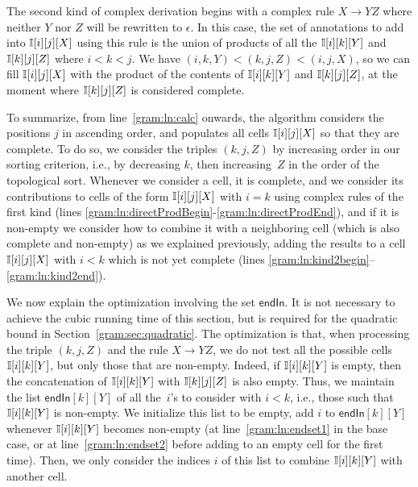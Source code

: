 The second kind of complex derivation begins with a complex rule $X
\rightarrow YZ$ where neither $Y$ nor $Z$ will be rewritten to $\epsilon$. In this case, the set of
annotations to add into $\mathbb{I}[i][j][X]$ using this rule is the union of
products of all the $\mathbb{I}[i][k][Y]$ and $\mathbb{I}[k][j][Z]$ where $i < k <
j$. We have $(i,k,Y)<(k,j,Z)<(i,j,X)$, so we can fill $\mathbb{I}[i][j][X]$ with the product of the contents of $\mathbb{I}[i][k][Y]$ and $\mathbb{I}[k][j][Z]$,
at the moment where $\mathbb{I}[k][j][Z]$ is considered complete.
%
%
%
%

To summarize, from line~\ref{gram:ln:calc} onwards, the algorithm
considers the positions $j$ in ascending order, and 
populates all cells $\mathbb{I}[i][j][X]$ so that they are complete. To do
so, we consider the triples $(k,j,Z)$ by increasing order in our
sorting criterion, i.e., by decreasing $k$, then increasing~$Z$ in the
order of the topological sort. Whenever we consider a cell, it is
complete, and we consider its contributions to cells of the form
$\mathbb{I}[i][j][X]$ with $i=k$ using complex rules of the first kind 
(lines \ref{gram:ln:directProdBegin}-\ref{gram:ln:directProdEnd}), and if it is non-empty
we consider how to combine it with
a neighboring cell (which is also complete and non-empty) as we explained previously,
adding the results to a cell $\mathbb{I}[i][j][X]$ with $i < k$ which is not yet complete (lines
\ref{gram:ln:kind2begin}--\ref{gram:ln:kind2end}).

We now explain the optimization involving the set $\mathsf{endIn}$. It
is not necessary to achieve the cubic running time of
this section, but is required for the quadratic bound in
Section~\ref{gram:sec:quadratic}.  The optimization is that, when processing the
triple $(k,j,Z)$ and the rule $X\rightarrow YZ$, we do not test all the
possible cells $\mathbb{I}[i][k][Y]$, but only those that are
non-empty. Indeed, if $\mathbb{I}[i][k][Y]$ is empty, then the concatenation of
$\mathbb{I}[i][k][Y]$ with $\mathbb{I}[k][j][Z]$ is also empty. Thus, we maintain
the list $\mathsf{endIn}[k][Y]$ of all the~$i$'s to consider
with $i<k$, i.e., those such that $\mathbb{I}[i][k][Y]$ is non-empty. We
initialize this list to be empty, add $i$ to $\mathsf{endIn}[k][Y]$ whenever
$\mathbb{I}[i][k][Y]$ becomes non-empty (at line~\ref{gram:ln:endset1} in the base
case, or at line~\ref{gram:ln:endset2} before adding to an empty cell for
the first time). Then, we only consider the indices
$i$ of this list to combine $\mathbb{I}[i][k][Y]$ with another cell.

